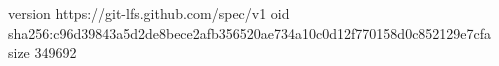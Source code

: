 version https://git-lfs.github.com/spec/v1
oid sha256:c96d39843a5d2de8bece2afb356520ae734a10c0d12f770158d0c852129e7cfa
size 349692
